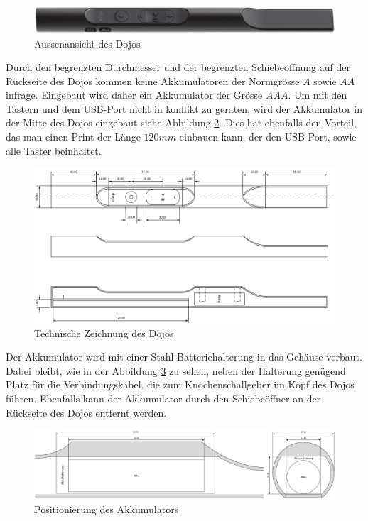 \begin{figure}[h]
	\centering
	\includegraphics[width=\textwidth]{graphics/DojoBild.png}
	\caption{Aussenansicht des Dojos}
	\label{fig:DojoBild}
\end{figure}

Durch den begrenzten Durchmesser und der begrenzten Schiebeöffnung auf der Rückseite des Dojos kommen keine Akkumulatoren der Normgrösse $A$ sowie $AA$ infrage. Eingebaut wird daher ein Akkumulator der Grösse $AAA$. Um mit den Tastern und dem USB-Port nicht in konflikt zu geraten, wird der Akkumulator in der Mitte des Dojos eingebaut siehe Abbildung \ref{fig:DojoQuerschnitt}. Dies hat ebenfalls den Vorteil, das man einen Print der Länge $120mm$ einbauen kann, der den USB Port, sowie alle Taster beinhaltet.

\begin{figure}[h]
	\centering
	\includegraphics[width=\textwidth]{graphics/DojoQuerschnitt.png}
	\caption{Technische Zeichnung des Dojos}
	\label{fig:DojoQuerschnitt}
\end{figure}

\newpage

Der Akkumulator wird mit einer Stahl Batteriehalterung in das Gehäuse verbaut. Dabei bleibt, wie in der Abbildung \ref{fig:DojoAkkumulatorQuerschnitt} zu sehen, neben der Halterung genügend Platz für die Verbindungskabel, die zum Knochenschallgeber im Kopf des Dojos führen. Ebenfalls kann der Akkumulator durch den Schiebeöffner an der Rückseite des Dojos entfernt werden.

\begin{figure}[h]
	\centering
	\includegraphics[width=\textwidth]{graphics/DojoAkkumulatorQuerschnitt.png}
	\caption{Positionierung des Akkumulators}
	\label{fig:DojoAkkumulatorQuerschnitt}
\end{figure}

